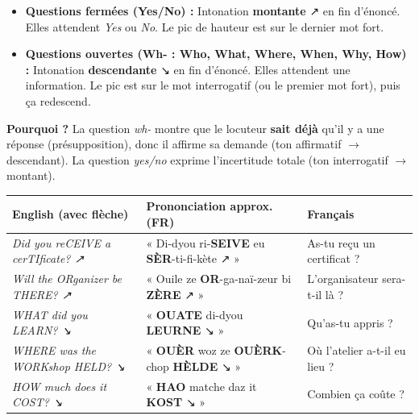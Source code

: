 \documentclass[11pt]{article}
\newcommand{\eng}[1]{\ifmmode\text{\textit{#1}}\else\begingroup\selectlanguage{english}\itshape #1\endgroup\fi}
\begin{document}
\begin{propriete}
\begin{itemize}
    \item \textbf{Questions fermées (Yes/No) :} Intonation \textbf{montante} ↗ en fin d'énoncé. Elles attendent \textit{Yes} ou \textit{No}. Le pic de hauteur est sur le dernier mot fort.
    \item \textbf{Questions ouvertes (Wh- : Who, What, Where, When, Why, How) :} Intonation \textbf{descendante} ↘ en fin d'énoncé. Elles attendent une information. Le pic est sur le mot interrogatif (ou le premier mot fort), puis ça redescend.
\end{itemize}
\textbf{Pourquoi ?} La question \textit{wh-} montre que le locuteur \textbf{sait déjà} qu'il y a une réponse (présupposition), donc il affirme sa demande (ton affirmatif $\to$ descendant). La question \textit{yes/no} exprime l'incertitude totale (ton interrogatif $\to$ montant).
\end{propriete}

\begin{exemplebox}
\begin{center}
\begin{tabularx}{\linewidth}{|X|X|X|}
\hline
\rowcolor{popblueL} \textbf{English (avec flèche)} & \textbf{Prononciation approx. (FR)} & \textbf{Français} \\
\hline
\eng{Did you reCEIVE a cerTIficate? ↗} & « Di-dyou ri-\textbf{SEIVE} eu \textbf{SÈR}-ti-fi-kète ↗ » & As-tu reçu un certificat ? \\
\hline
\eng{Will the ORganizer be THERE? ↗} & « Ouile ze \textbf{OR}-ga-naï-zeur bi \textbf{ZÈRE} ↗ » & L'organisateur sera-t-il là ? \\
\hline
\eng{WHAT did you LEARN? ↘} & « \textbf{OUATE} di-dyou \textbf{LEURNE} ↘ » & Qu'as-tu appris ? \\
\hline
\eng{WHERE was the WORKshop HELD? ↘} & « \textbf{OUÈR} woz ze \textbf{OUÈRK}-chop \textbf{HÈLDE} ↘ » & Où l'atelier a-t-il eu lieu ? \\
\hline
\eng{HOW much does it COST? ↘} & « \textbf{HAO} matche daz it \textbf{KOST} ↘ » & Combien ça coûte ? \\
\hline
\end{tabularx}
\end{center}
\end{exemplebox}
\end{document}
